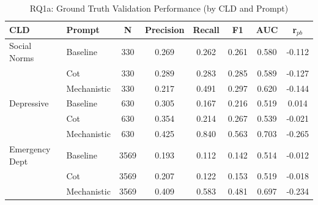 \begin{table}[htbp]
\centreing
\caption{RQ1a: Ground Truth Validation Performance (by CLD and Prompt)}
\label{tab:rq1a_gt_main}
\begin{tabular}{llcccccc}
\toprule
\textbf{CLD} & \textbf{Prompt} & \textbf{N} & \textbf{Precision} & \textbf{Recall} & \textbf{F1} & \textbf{AUC} & \textbf{r$_{pb}$} \\
\midrule
Social Norms & Baseline & 330 & 0.269 & 0.262 & 0.261 & 0.580 & -0.112 \\
 & Cot & 330 & 0.289 & 0.283 & 0.285 & 0.589 & -0.127 \\
 & Mechanistic & 330 & 0.217 & 0.491 & 0.297 & 0.620 & -0.144 \\
\midrule
Depressive & Baseline & 630 & 0.305 & 0.167 & 0.216 & 0.519 & 0.014 \\
 & Cot & 630 & 0.354 & 0.214 & 0.267 & 0.539 & -0.021 \\
 & Mechanistic & 630 & 0.425 & 0.840 & 0.563 & 0.703 & -0.265 \\
\midrule
Emergency Dept & Baseline & 3569 & 0.193 & 0.112 & 0.142 & 0.514 & -0.012 \\
 & Cot & 3569 & 0.207 & 0.122 & 0.153 & 0.519 & -0.018 \\
 & Mechanistic & 3569 & 0.409 & 0.583 & 0.481 & 0.697 & -0.234 \\
\midrule
\bottomrule
\end{tabular}
\end{table}